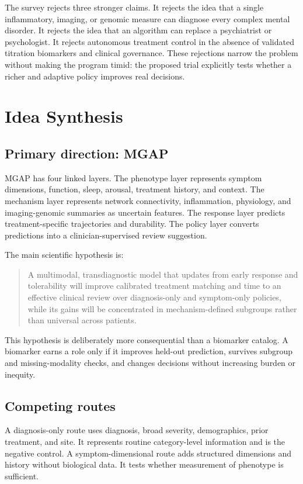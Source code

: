 \documentclass[conference]{IEEEtran}
\begin{document}
The survey rejects three stronger claims. It rejects the idea that a single inflammatory, imaging, or genomic measure can diagnose every complex mental disorder. It rejects the idea that an algorithm can replace a psychiatrist or psychologist. It rejects autonomous treatment control in the absence of validated titration biomarkers and clinical governance. These rejections narrow the problem without making the program timid: the proposed trial explicitly tests whether a richer and adaptive policy improves real decisions.

\section{Idea Synthesis}
\subsection{Primary direction: MGAP}
MGAP has four linked layers. The phenotype layer represents symptom dimensions, function, sleep, arousal, treatment history, and context. The mechanism layer represents network connectivity, inflammation, physiology, and imaging-genomic summaries as uncertain features. The response layer predicts treatment-specific trajectories and durability. The policy layer converts predictions into a clinician-supervised review suggestion.

The main scientific hypothesis is:
\begin{quote}
A multimodal, transdiagnostic model that updates from early response and tolerability will improve calibrated treatment matching and time to an effective clinical review over diagnosis-only and symptom-only policies, while its gains will be concentrated in mechanism-defined subgroups rather than universal across patients.
\end{quote}

This hypothesis is deliberately more consequential than a biomarker catalog. A biomarker earns a role only if it improves held-out prediction, survives subgroup and missing-modality checks, and changes decisions without increasing burden or inequity.

\subsection{Competing routes}
A diagnosis-only route uses diagnosis, broad severity, demographics, prior treatment, and site. It represents routine category-level information and is the negative control. A symptom-dimensional route adds structured dimensions and history without biological data. It tests whether measurement of phenotype is sufficient.
\end{document}
